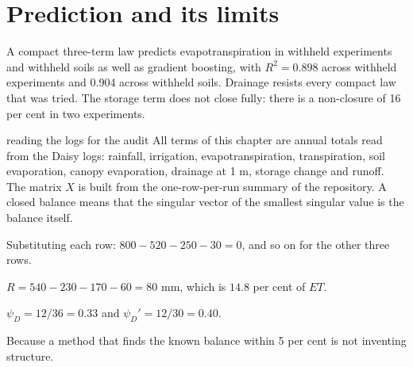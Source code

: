 


\section{Prediction and its limits}
A compact three-term law predicts evapotranspiration in withheld experiments and withheld soils as well as gradient boosting, with $R^2=0.898$ across withheld experiments and 0.904 across withheld soils. Drainage resists every compact law that was tried. The storage term does not close fully: there is a non-closure of 16 per cent in two experiments.

\begin{daisybox}{reading the logs for the audit}
All terms of this chapter are annual totals read from the Daisy logs: rainfall, irrigation, evapotranspiration, transpiration, soil evaporation, canopy evaporation, drainage at 1 m, storage change and runoff. The matrix $X$ is built from the one-row-per-run summary of the repository. A closed balance means that the singular vector of the smallest singular value is the balance itself.
\end{daisybox}

\sol  Substituting each row: $800-520-250-30=0$, and so on for the other three rows.

\sol  $R=540-230-170-60=80$ mm, which is $14.8$ per cent of $ET$.

\sol  $\psi_D=12/36=0.33$ and $\psi_D'=12/30=0.40$.

\sol  Because a method that finds the known balance within 5 per cent is not inventing structure.



